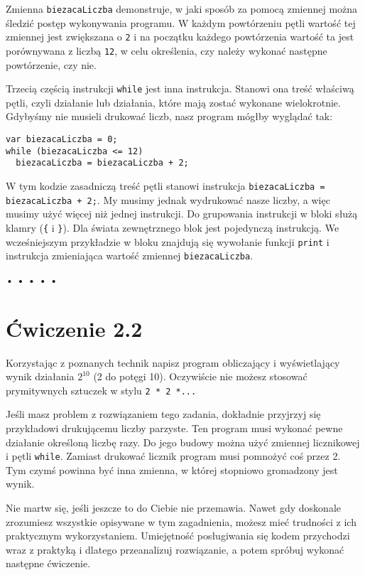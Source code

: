     
Zmienna \texttt{biezacaLiczba} demonstruje, w jaki sposób za pomocą zmiennej można śledzić postęp wykonywania programu. W każdym powtórzeniu pętli wartość tej zmiennej jest zwiększana o \texttt{2} i na początku każdego powtórzenia wartość ta jest porównywana z liczbą \texttt{12}, w celu określenia, czy należy wykonać następne powtórzenie, czy nie.

    
Trzecią częścią instrukcji \texttt{while} jest inna instrukcja. Stanowi ona treść właściwą pętli, czyli działanie lub działania, które mają zostać wykonane wielokrotnie. Gdybyśmy nie musieli drukować liczb, nasz program mógłby wyglądać tak:

\begin{verbatim} 
var biezacaLiczba = 0;
while (biezacaLiczba <= 12)
  biezacaLiczba = biezacaLiczba + 2;
\end{verbatim}
    
W tym kodzie zasadniczą treść pętli stanowi instrukcja \texttt{biezacaLiczba = biezacaLiczba + 2;}. My musimy jednak wydrukować nasze liczby, a więc musimy użyć więcej niż jednej instrukcji. Do grupowania instrukcji w bloki służą klamry (\texttt{\{} i \texttt{\}})\index{\{\}}. Dla świata zewnętrznego blok jest pojedynczą instrukcją. We wcześniejszym przykładzie w bloku znajdują się wywołanie funkcji \texttt{print} i instrukcja zmieniająca wartość zmiennej \texttt{biezacaLiczba}.

  
\begin{center}
• • • • •
\end{center}
  
\section*{Ćwiczenie 2.2}
\label{sec:2.2}
    
      
Korzystając z poznanych technik napisz program obliczający i wyświetlający wynik działania $2^{10}$ (2 do potęgi 10). Oczywiście nie możesz stosować prymitywnych sztuczek w stylu \texttt{2 * 2 *...}

      
Jeśli masz problem z rozwiązaniem tego zadania, dokładnie przyjrzyj się przykładowi drukującemu liczby parzyste. Ten program musi wykonać pewne działanie określoną liczbę razy. Do jego budowy można użyć zmiennej licznikowej i pętli \texttt{while}. Zamiast drukować licznik program musi pomnożyć coś przez 2. Tym czymś powinna być inna zmienna, w której stopniowo gromadzony jest wynik.

      
Nie martw się, jeśli jeszcze to do Ciebie nie przemawia. Nawet gdy doskonale zrozumiesz wszystkie opisywane w tym zagadnienia, możesz mieć trudności z ich praktycznym wykorzystaniem. Umiejętność posługiwania się kodem przychodzi wraz z praktyką i dlatego przeanalizuj rozwiązanie, a potem spróbuj wykonać następne ćwiczenie.
  
